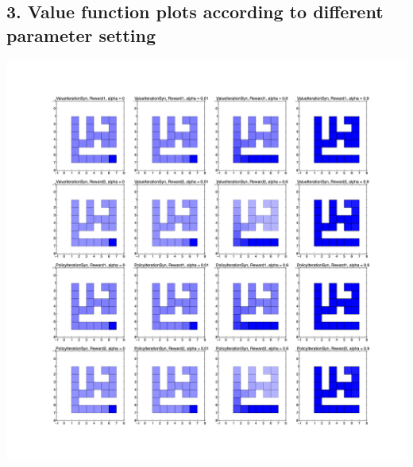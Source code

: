 \documentclass[12pt,a4paper,titlepage]{article}
\begin{document}
\subsection*{3. Value function plots according to different parameter setting}
\begin{center}
\includegraphics[scale=0.11]{ValueFunctionPlot.jpg}
\end{center}
\end{document}
